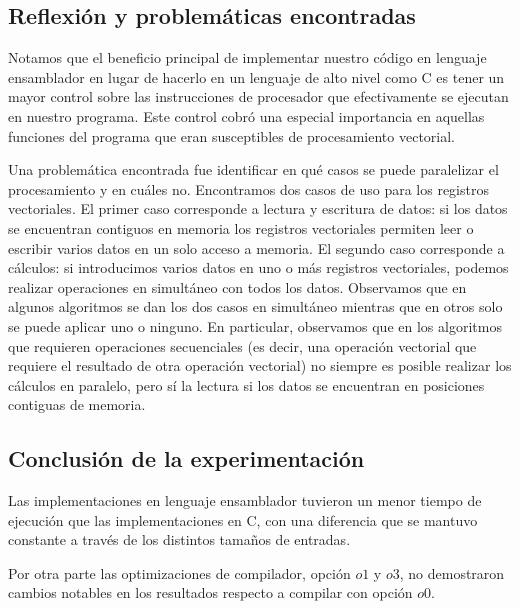 \subsection{Reflexión y problemáticas encontradas}
\par Notamos que el beneficio principal de implementar nuestro código en lenguaje ensamblador en lugar de hacerlo en un lenguaje de alto nivel como C es tener un mayor control sobre las instrucciones de procesador que efectivamente se ejecutan en nuestro programa. Este control cobró una especial importancia en aquellas funciones del programa que eran susceptibles de procesamiento vectorial.\newline

\par Una problemática encontrada fue identificar en qué casos se puede paralelizar el procesamiento y en cuáles no. Encontramos dos casos de uso para los registros vectoriales. El primer caso corresponde a lectura y escritura de datos: si los datos se encuentran contiguos en memoria los registros vectoriales permiten leer o escribir varios datos en un solo acceso a memoria. El segundo caso corresponde a cálculos: si introducimos varios datos en uno o más registros vectoriales, podemos realizar operaciones en simultáneo con todos los datos. Observamos que en algunos algoritmos se dan los dos casos en simultáneo mientras que en otros solo se puede aplicar uno o ninguno. En particular, observamos que en los algoritmos que requieren operaciones secuenciales (es decir, una operación vectorial que requiere el resultado de otra operación vectorial) no siempre es posible realizar los cálculos en paralelo, pero sí la lectura si los datos se encuentran en posiciones contiguas de memoria.

\subsection{Conclusión de la experimentación}

\par Las implementaciones en lenguaje ensamblador tuvieron un menor tiempo de ejecución que las implementaciones en C, con una diferencia que se mantuvo constante a través de los distintos tamaños de entradas.\newline

\par Por otra parte las optimizaciones de compilador, opción $o1$ y $o3$, no demostraron cambios notables en los resultados respecto a compilar con opción $o0$.
